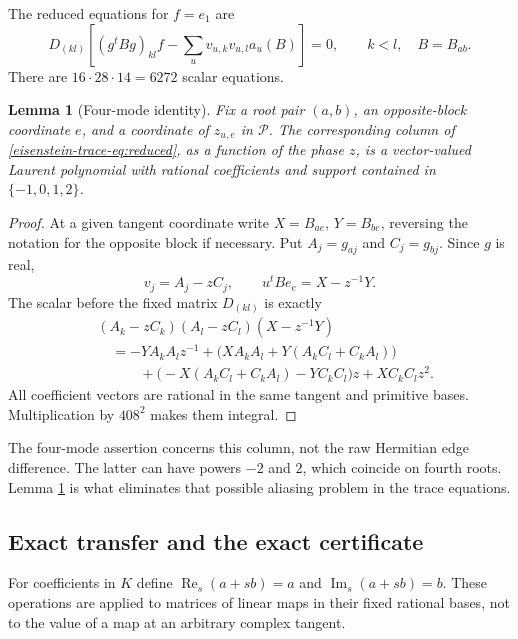 \documentclass[11pt]{article}
\newtheorem{lemma}[theorem]{Lemma}
\theoremstyle{definition}
\theoremstyle{remark}
\newcommand{\cP}{\mathcal P}
\newcommand{\Ree}{\operatorname{Re}_s}
\newcommand{\Imm}{\operatorname{Im}_s}
\begin{document}
The reduced equations for $f=e_1$ are
\begin{equation}\label{eisenstein-trace-eq:reduced}
 D_{(kl)}\left[(g^tBg)_{kl}f-
              \sum_u v_{u,k}v_{u,l}a_u(B)\right]=0,
 \qquad k<l,\quad B=B_{ab}.
\end{equation}
There are $16\cdot28\cdot14=6272$ scalar equations.

\begin{lemma}[Four-mode identity]\label{eisenstein-trace-lem:four-mode}
Fix a root pair $(a,b)$, an opposite-block coordinate $e$, and a
coordinate of $z_{u,e}$ in $\cP$.  The corresponding column of
\eqref{eisenstein-trace-eq:reduced}, as a function of the phase $z$, is a vector-valued
Laurent polynomial with rational coefficients and support contained
in $\{-1,0,1,2\}$.
\end{lemma}
\begin{proof}
At a given tangent coordinate write $X=B_{ae}$, $Y=B_{be}$, reversing
the notation for the opposite block if necessary.  Put
$A_j=g_{aj}$ and $C_j=g_{bj}$.  Since $g$ is real,
\[
 v_j=A_j-zC_j,\qquad u^tBe_e=X-z^{-1}Y.
\]
The scalar before the fixed matrix $D_{(kl)}$ is exactly
\begin{align*}
 &(A_k-zC_k)(A_l-zC_l)(X-z^{-1}Y)\\
 &\quad=-YA_kA_lz^{-1}
  +\bigl(XA_kA_l+Y(A_kC_l+C_kA_l)\bigr)\\
 &\qquad\quad+\bigl(-X(A_kC_l+C_kA_l)-YC_kC_l\bigr)z
  +XC_kC_lz^2.
\end{align*}
All coefficient vectors are rational in the same tangent and primitive
bases.  Multiplication by $408^2$ makes them integral.
\end{proof}

The four-mode assertion concerns this column, not the raw Hermitian
edge difference.  The latter can have powers $-2$ and $2$, which
coincide on fourth roots.  Lemma \ref{eisenstein-trace-lem:four-mode} is what eliminates
that possible aliasing problem in the trace equations.

\subsection{Exact transfer and the exact certificate}

For coefficients in $K$ define $\Ree(a+sb)=a$ and $\Imm(a+sb)=b$.
These operations are applied to matrices of linear maps in their fixed
rational bases, not to the value of a map at an arbitrary complex tangent.
\end{document}

